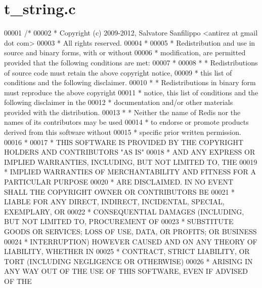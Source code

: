 \hypertarget{t__string_8c_source}{}\section{t\+\_\+string.\+c}
\label{t__string_8c_source}

\begin{DoxyCode}
00001 \textcolor{comment}{/*}
00002 \textcolor{comment}{ * Copyright (c) 2009-2012, Salvatore Sanfilippo <antirez at gmail dot com>}
00003 \textcolor{comment}{ * All rights reserved.}
00004 \textcolor{comment}{ *}
00005 \textcolor{comment}{ * Redistribution and use in source and binary forms, with or without}
00006 \textcolor{comment}{ * modification, are permitted provided that the following conditions are met:}
00007 \textcolor{comment}{ *}
00008 \textcolor{comment}{ *   * Redistributions of source code must retain the above copyright notice,}
00009 \textcolor{comment}{ *     this list of conditions and the following disclaimer.}
00010 \textcolor{comment}{ *   * Redistributions in binary form must reproduce the above copyright}
00011 \textcolor{comment}{ *     notice, this list of conditions and the following disclaimer in the}
00012 \textcolor{comment}{ *     documentation and/or other materials provided with the distribution.}
00013 \textcolor{comment}{ *   * Neither the name of Redis nor the names of its contributors may be used}
00014 \textcolor{comment}{ *     to endorse or promote products derived from this software without}
00015 \textcolor{comment}{ *     specific prior written permission.}
00016 \textcolor{comment}{ *}
00017 \textcolor{comment}{ * THIS SOFTWARE IS PROVIDED BY THE COPYRIGHT HOLDERS AND CONTRIBUTORS "AS IS"}
00018 \textcolor{comment}{ * AND ANY EXPRESS OR IMPLIED WARRANTIES, INCLUDING, BUT NOT LIMITED TO, THE}
00019 \textcolor{comment}{ * IMPLIED WARRANTIES OF MERCHANTABILITY AND FITNESS FOR A PARTICULAR PURPOSE}
00020 \textcolor{comment}{ * ARE DISCLAIMED. IN NO EVENT SHALL THE COPYRIGHT OWNER OR CONTRIBUTORS BE}
00021 \textcolor{comment}{ * LIABLE FOR ANY DIRECT, INDIRECT, INCIDENTAL, SPECIAL, EXEMPLARY, OR}
00022 \textcolor{comment}{ * CONSEQUENTIAL DAMAGES (INCLUDING, BUT NOT LIMITED TO, PROCUREMENT OF}
00023 \textcolor{comment}{ * SUBSTITUTE GOODS OR SERVICES; LOSS OF USE, DATA, OR PROFITS; OR BUSINESS}
00024 \textcolor{comment}{ * INTERRUPTION) HOWEVER CAUSED AND ON ANY THEORY OF LIABILITY, WHETHER IN}
00025 \textcolor{comment}{ * CONTRACT, STRICT LIABILITY, OR TORT (INCLUDING NEGLIGENCE OR OTHERWISE)}
00026 \textcolor{comment}{ * ARISING IN ANY WAY OUT OF THE USE OF THIS SOFTWARE, EVEN IF ADVISED OF THE}

\end{DoxyCode}
